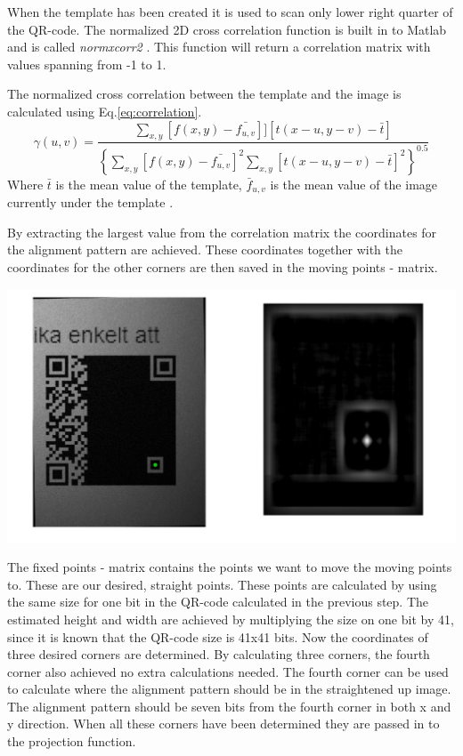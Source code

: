 \documentclass[12pt,a4paper]{article}
\newenvironment{Figure}
  {\par\medskip\noindent\minipage{\linewidth}}
  {\endminipage\par\medskip}
\begin{document}
When the template has been created it is used to scan only lower right quarter of the QR-code. The normalized 2D cross correlation function is built in to Matlab and is called \textit{normxcorr2} \cite{normxcorr}. This function will return a correlation matrix with values spanning from -1 to 1. 

The normalized cross correlation between the template and the image is calculated using Eq.\ref{eq:correlation}.
\begin{equation}\label{eq:correlation}
	\gamma(u,v)=\frac{\sum_{x,y} [f(x,y)-\bar{f_{u,v}}]][t(x-u,y-v)-\bar{t}]}{\left \{ \sum_{x,y}[f(x,y)-\bar{f_{u,v}}]^2\sum_{x,y}[t(x-u,y-v)-\bar{t}]^2   \right \}^{0.5}}
\end{equation}
Where $\bar{t}$ is the mean value of the template, $\bar{f}_{u,v}$ is the mean value of the image currently under the template \cite{lewisfast}. 

By extracting the largest value from the correlation matrix the coordinates for the alignment pattern are achieved. These coordinates together with the coordinates for the other corners are then saved in the moving points - matrix. 
\begin{Figure}
  \centering
    \includegraphics[width=1\linewidth]{./img/correlation.png}
\end{Figure}

The fixed points - matrix contains the points we want to move the moving points to. These are our desired, straight points. These points are calculated by using the same size for one bit in the QR-code calculated in the previous step. The estimated height and width are achieved by multiplying the size on one bit by 41, since it is known that the QR-code size is 41x41 bits. Now the coordinates of three desired corners are determined. By calculating three corners, the fourth corner also achieved no extra calculations needed. The fourth corner can be used to calculate where the alignment pattern should be in the straightened up image. The alignment pattern should be seven bits from the fourth corner in both x and y direction. When all these corners have been determined they are passed in to the projection function. 
\end{document}
